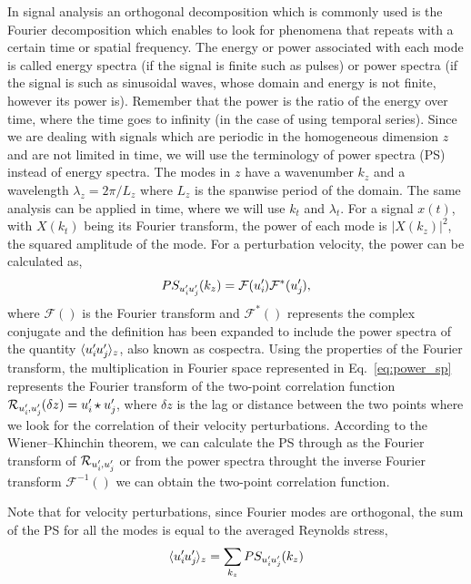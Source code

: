 In signal analysis an orthogonal decomposition which is commonly used is the Fourier decomposition which enables to look for phenomena that repeats with a certain time or spatial frequency. The energy or power associated with each mode is called energy spectra (if the signal is finite such as pulses) or power spectra (if the signal is such as sinusoidal waves, whose domain and energy is not finite, however its power is). Remember that the power is the ratio of the energy over time, where the time goes to infinity (in the case of using temporal series).
Since we are dealing with signals which are periodic in the homogeneous dimension $z$ and are not limited in time, we will use the terminology of power spectra (PS) instead of energy spectra. 
The modes in $z$ have a wavenumber $k_z$ and a wavelength $\lambda_z=2\pi/L_z$ where $L_z$ is the spanwise period of the domain. The same analysis can be applied in time, where we will use $k_t$ and $\lambda_t$.
For a signal $x(t)$, with $X(k_t)$ being its Fourier transform, the power of each mode is $|X(k_z)|^2$, the squared amplitude of the mode. For a perturbation velocity, the power can be calculated as,
\begin{equation}
    PS_{u_i^{\prime}\mkern-1.2mu u_j^{\prime}\mkern-1.2mu}(k_z) = \mathcal{F}(u_i ^{\prime}\mkern-1.2mu)  \mathcal{F}^*(u_j ^{\prime}\mkern-1.2mu),
    \label{eq:power_sp}
\end{equation}
where $\mathcal{F}()$ is the Fourier transform and $\mathcal{F}^*()$ represents the complex conjugate and the definition has been expanded to include the power spectra of the quantity $\langle u_i^{\prime}\mkern-1.2mu u_j^{\prime}\mkern-1.2mu \rangle_{z}$, also known as cospectra.
Using the properties of the Fourier transform, the multiplication in Fourier space represented in Eq.~\ref{eq:power_sp} represents the Fourier transform of the two-point correlation function $\mathcal{R}_{u_i^{\prime}\mkern-1.2mu, u_j^{\prime}\mkern-1.2mu}(\delta z)=u_i^{\prime}\mkern-1.2mu \star u_j^{\prime}\mkern-1.2mu$, where $\delta z$ is the lag or distance between the two points where we look for the correlation of their velocity perturbations. According to the Wiener--Khinchin theorem, we can calculate the PS through as the Fourier transform of $\mathcal{R}_{u_i^{\prime}\mkern-1.2mu, u_j^{\prime}\mkern-1.2mu}$ or from the power spectra throught the inverse Fourier transform $\mathcal{F}^{-1}()$ we can obtain the two-point correlation function.

Note that for velocity perturbations, since Fourier modes are orthogonal, the sum of the PS for all the modes is equal to the averaged Reynolds stress,
\begin{equation}
    \langle u_i^{\prime}\mkern-1.2mu u_j^{\prime}\mkern-1.2mu \rangle_{z} = \sum_{k_z} PS_{u_i^{\prime}\mkern-1.2mu u_j^{\prime}\mkern-1.2mu}(k_z)
\end{equation}

